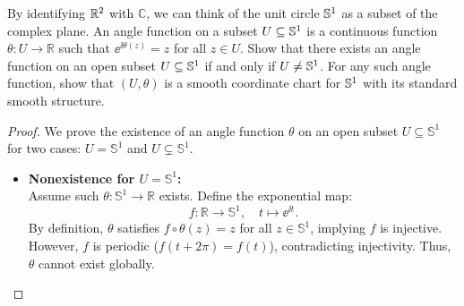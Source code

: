 \begin{problem}
  By identifying $\mathbb{R}^2$ with $\mathbb{C}$, we can think of the unit circle $\mathbb{S}^1$ as a subset of the complex plane. An angle function on a subset $U \subseteq \mathbb{S}^1$ is a continuous function $\theta \colon U \to \mathbb{R}$ such that  $\ee^{\ii \theta(z)} = z$ for all $z \in U$. Show that there exists an angle function on an open subset $U \subseteq \mathbb{S}^1$ if and only if $U \neq \mathbb{S}^1$. For any such angle function, show that $(U, \theta)$ is a smooth coordinate chart for $\mathbb{S}^1$ with its standard smooth structure.
  \begin{proof}
    We prove the existence of an angle function $\theta$ on an open subset $U \subseteq \mathbb{S}^1$ for two cases: $U = \mathbb{S}^1$ and $U \subsetneq \mathbb{S}^1$.
    \begin{itemize}
        \item \textbf{Nonexistence for $U = \mathbb{S}^1$:} \\
        Assume such $\theta \colon \mathbb{S}^1 \to \mathbb{R}$ exists. Define the exponential map:
        $$
        f \colon \mathbb{R} \to \mathbb{S}^1, \quad t \mapsto \ee^{\ii t}.
        $$
        By definition, $\theta$ satisfies $f \circ \theta(z) = z$ for all $z \in \mathbb{S}^1$, implying $f$ is injective. However, $f$ is periodic ($f(t+2\pi)=f(t)$), contradicting injectivity. Thus, $\theta$ cannot exist globally.


\end{itemize}
\end{proof}
\end{problem}
